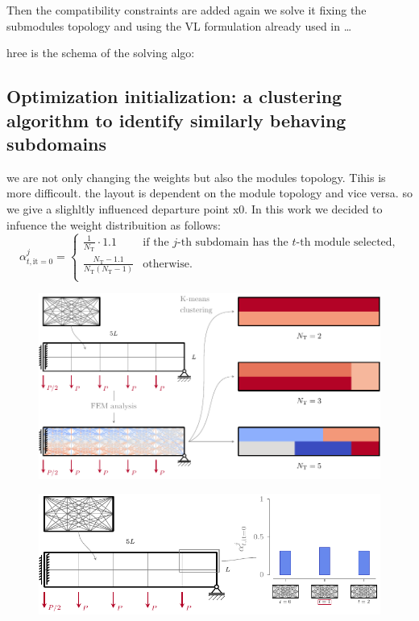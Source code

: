 Then the compatibility constraints are added again
we solve it fixing the submodules topology and using the VL formulation already used in \dots

hree is the schema of the solving algo:


\subsection{Optimization initialization: a clustering algorithm to identify similarly behaving subdomains}
we are not only changing the weights but also the modules topology. Tihis is more difficoult. the layout is dependent on the module topology and vice versa. so we give a slighltly influenced departure point x0. In this work we decided to infuence the weight distribuition as follows:
\begin{equation}
    \alpha_{t,\text{it}=0}^j=
    \begin{cases}
        \frac{1}{N_\text{T}} \cdot 1.1  & \text{if the $j$-th subdomain has the  $t$-th module selected,}\\
        \frac{N_\text{T}-1.1}{N_\text{T}(N_\text{T}-1)} & \text{otherwise.} \\
    \end{cases}  
\end{equation}

\begin{figure}
    \centering
    \includegraphics{figures/06_DMO/00_stress_clustering/stress_clustering.pdf}
    \caption{}
    \label{fig:06}
\end{figure}

\begin{figure}
    \centering
    \includegraphics{figures/06_DMO/00_x0/x0.pdf}
    \caption{}
    \label{fig:06}
\end{figure}

